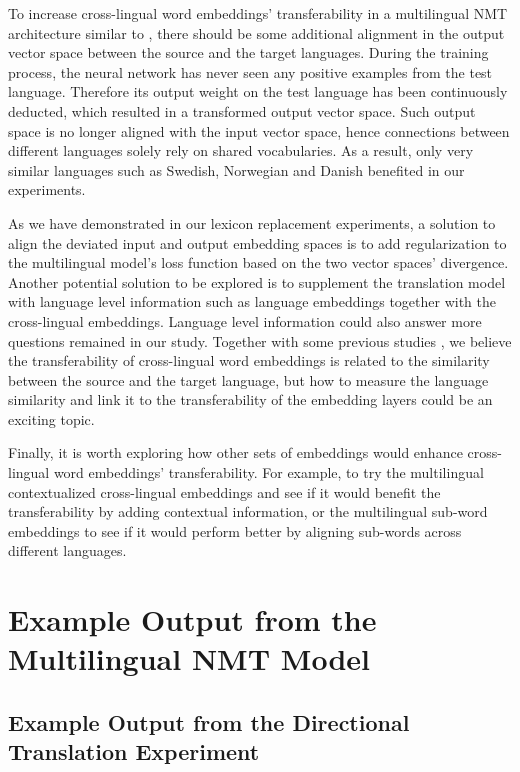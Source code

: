 \documentclass[thesis,fonts=libertine]{cluu}
\begin{document}
To increase cross-lingual word embeddings' transferability in a multilingual NMT architecture similar to \textcite{Johnson:2016aa}, there should be some additional alignment in the output vector space between the source and the target languages. During the training process, the neural network has never seen any positive examples from the test language. Therefore its output weight on the test language has been continuously deducted, which resulted in a transformed output vector space. Such output space is no longer aligned with the input vector space, hence connections between different languages solely rely on shared vocabularies. As a result, only very similar languages such as Swedish, Norwegian and Danish benefited in our experiments.

As we have demonstrated in our lexicon replacement experiments, a solution to align the deviated input and output embedding spaces is to add regularization to the multilingual model's loss function based on the two vector spaces' divergence. Another potential solution to be explored is to supplement the translation model with language level information such as language embeddings \parencite{littell-etal-2017-uriel,malaviya-etal-2017-learning} together with the cross-lingual embeddings. Language level information could also answer more questions remained in our study. Together with some previous studies \parencite{Qi:2018aa,aji-etal-2020-neural}, we believe the transferability of cross-lingual word embeddings is related to the similarity between the source and the target language, but how to measure the language similarity and link it to the transferability of the embedding layers could be an exciting topic.

Finally, it is worth exploring how other sets of embeddings would enhance cross-lingual word embeddings' transferability. For example, to try the multilingual contextualized cross-lingual embeddings \parencite{devlin-etal-2019-bert} and see if it would benefit the transferability by adding contextual information, or the multilingual sub-word embeddings \parencite{Heinzerling:2017aa} to see if it would perform better by aligning sub-words across different languages.

\appendix
\chapter{Example Output from the Multilingual NMT Model}
\label{chap:example_output}

\section{Example Output from the Directional Translation Experiment}
\label{sec:directional_output}
\end{document}
